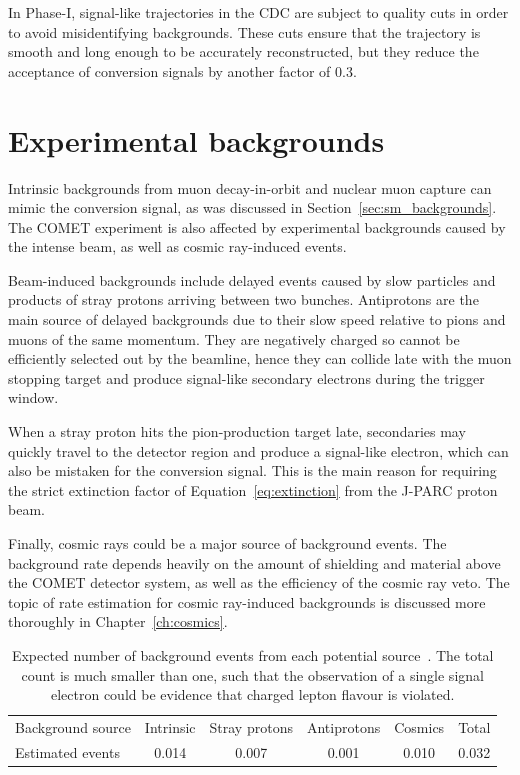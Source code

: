 In Phase-I, signal-like trajectories in the CDC are subject to quality cuts in
order to avoid misidentifying backgrounds. These cuts ensure that the trajectory
is smooth and long enough to be accurately reconstructed, but they reduce the
acceptance of conversion signals by another factor of 0.3.




\section{Experimental backgrounds}\label{sec:backgrounds}

Intrinsic backgrounds from muon decay-in-orbit and nuclear muon capture can
mimic the conversion signal, as was discussed in Section~\ref{sec:sm_backgrounds}.
The COMET experiment is also affected by experimental backgrounds caused by the
intense beam, as well as cosmic ray-induced events.

Beam-induced backgrounds include delayed events caused by slow particles and
products of stray protons arriving between two bunches.
Antiprotons are the main source of delayed backgrounds due to their slow
speed relative to pions and muons of the same momentum. They are negatively
charged so cannot be efficiently selected out by the beamline, hence they can
collide late with the muon stopping target and produce signal-like secondary
electrons during the trigger window.

When a stray proton hits the pion-production target late, secondaries may
quickly travel to the detector region and produce a signal-like electron, which
can also be mistaken for the conversion signal. This is the main reason for requiring
the strict extinction factor of Equation~\ref{eq:extinction} from the J-PARC
proton beam.

Finally, cosmic rays could be a major source of background events. The
background rate depends heavily on the amount of shielding and material above
the COMET detector system, as well as the efficiency of the cosmic ray veto. The
topic of rate estimation for cosmic ray-induced backgrounds is discussed more
thoroughly in Chapter~\ref{ch:cosmics}.

\begin{table}
    \centering
    \begin{tabular}{l|cccc|c}
        \toprule
        Background source & Intrinsic & Stray protons & Antiprotons &
        Cosmics  & Total\\ 
        Estimated events & 0.014 & 0.007 & 0.001 & 0.010 & 0.032 \\ \bottomrule
    \end{tabular}
    \caption{Expected number of background events from each potential
    source~\cite{the_comet_collaboration_comet_2020}. The total count is much
    smaller than one, such that the observation of a single signal electron
    could be evidence that charged lepton flavour is violated.}
    \label{tab:backgrounds}
\end{table}


